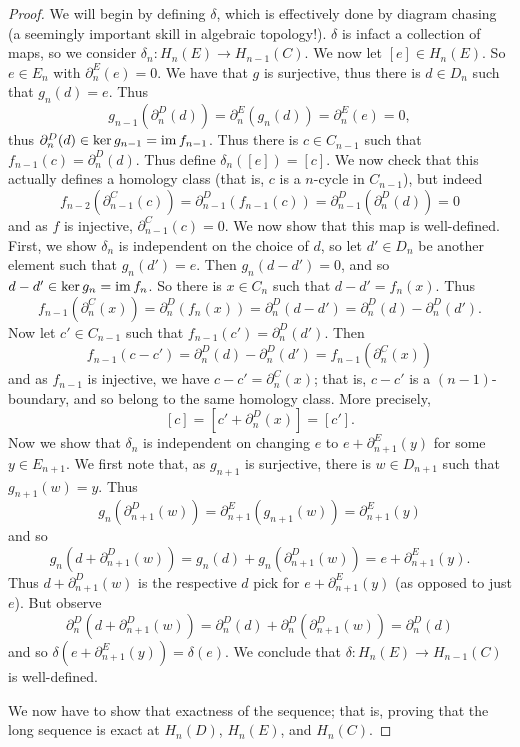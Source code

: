 \begin{proof}
	We will begin by defining $\delta$, which is effectively done by diagram chasing (a seemingly important skill in algebraic topology!). $\delta$ is infact a collection of maps, so we consider $\delta_n: H_{n}(E) \to H_{n-1}(C)$. We now let $[e] \in H_n(E)$. So $e \in E_n$ with $\partial_n^E(e) = 0$. We have that $g$ is surjective, thus there is $d \in D_n$ such that $g_n(d) = e$. Thus
	\[g_{n-1}(\partial_n^D(d)) = \partial_n^E(g_n(d)) = \partial_n^E(e) = 0, \]
	thus $\partial_n^D(d) \in \ker g_{n-1} = \operatorname{im} f_{n-1}$. Thus there is $c \in C_{n-1}$ such that $f_{n-1}(c) = \partial_n^D(d)$. Thus define $\delta_n([e]) = [c]$. We now check that this actually defines a homology class (that is, $c$ is a $n$-cycle in $C_{n-1}$), but indeed
	\[ f_{n-2}(\partial_{n-1}^C(c)) = \partial_{n-1}^D(f_{n-1}(c)) = \partial_{n-1}^D(\partial_n^D(d)) = 0 \]
	and as $f$ is injective, $\partial_{n-1}^C(c) = 0$. We now show that this map is well-defined. First, we show $\delta_n$ is independent on the choice of $d$, so let $d' \in D_n$ be another element such that $g_n(d') = e$. Then $g_n(d-d')=0$, and so $d - d' \in \ker g_n = \operatorname{im} f_n$. So there is $x \in C_n$ such that $d - d' = f_n(x)$. Thus
	\[f_{n-1}(\partial_n^C(x)) = \partial_n^D(f_n(x)) = \partial_n^D(d - d') = \partial_n^D(d) - \partial_n^D(d').\]
	Now let $c' \in C_{n-1}$ such that $f_{n-1}(c') = \partial_n^D(d')$. Then
	\[f_{n-1}(c - c') = \partial_n^D(d) - \partial_n^D(d') = f_{n-1}(\partial_n^C(x))\]
	and as $f_{n-1}$ is injective, we have $c - c' = \partial_n^C(x)$; that is, $c - c'$ is a $(n-1)$-boundary, and so belong to the same homology class. More precisely,
	\[[c] = [c' + \partial_n^D(x)] = [c'].\]
	Now we show that $\delta_n$ is independent on changing $e$ to $e + \partial_{n+1}^E(y)$ for some $y \in E_{n+1}$. We first note that, as $g_{n+1}$ is surjective, there is $w \in D_{n+1}$ such that $g_{n+1}(w) = y$. Thus
	\[g_{n}(\partial_{n+1}^D(w))=\partial_{n+1}^E(g_{n+1}(w))=\partial_{n+1}^E(y)\]
	and so
	\[g_n(d+\partial_{n+1}^D(w))=g_n(d)+g_n(\partial_{n+1}^D(w))=e+\partial_{n+1}^E(y).\]
	Thus $d + \partial_{n+1}^D(w)$ is the respective $d$ pick for $e + \partial_{n+1}^E(y)$ (as opposed to just $e$). But observe
	\[\partial_n^D(d+\partial_{n+1}^D(w))=\partial_n^D(d)+\partial_n^D(\partial_{n+1}^D(w))=\partial_n^D(d)\]
	and so $\delta(e + \partial_{n+1}^E(y))=\delta(e)$. We conclude that $\delta: H_n(E) \to H_{n-1}(C)$ is well-defined.

	We now have to show that exactness of the sequence; that is, proving that the long sequence is exact at $H_n(D)$, $H_n(E)$, and $H_n(C)$.


\end{proof}
